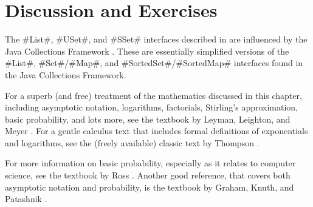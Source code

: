 \section{Discussion and Exercises}

The #List#, #USet#, and #SSet# interfaces described in
 are influenced by the Java Collections Framework
\cite{oracle_collections}.  These are essentially simplified versions of
the #List#, #Set#/#Map#, and #SortedSet#/#SortedMap# interfaces found in
the Java Collections Framework.  

For a superb (and free) treatment of the mathematics discussed in this
chapter, including asymptotic notation, logarithms, factorials, Stirling's
approximation, basic probability, and lots more, see the textbook by
Leyman, Leighton, and Meyer \cite{llm11}.  For a gentle calculus text
that includes formal definitions of exponentials and logarithms, see the
(freely available) classic text by Thompson \cite{t14}.

For more information on basic probability, especially as it relates to
computer science, see the textbook by Ross \cite{r01}.  Another good
reference, that covers both asymptotic notation and probability, is the
textbook by Graham, Knuth, and Patashnik \cite{gkp94}.


